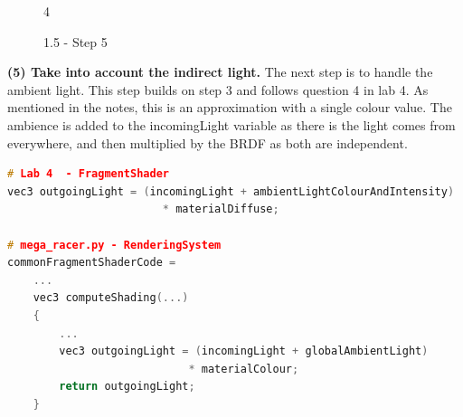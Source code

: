 \documentclass[a4 paper, 12pt]{article}
\begin{document}
    \begin{figure} [H]
        \caption{1.5 - Step 5}   4
    \end{figure}

\textbf{(5) Take into account the indirect light.}
The next step is to handle the ambient light. This step builds on step 3 and follows question 4 in lab 4. As mentioned in the notes, this is an approximation with a single colour value. The ambience is added to the incomingLight variable as there is the light comes from everywhere, and then multiplied by the BRDF as both are independent.
    \begin{lstlisting}[language=c++] 
# Lab 4  - FragmentShader
vec3 outgoingLight = (incomingLight + ambientLightColourAndIntensity) 
                        * materialDiffuse;

# mega_racer.py - RenderingSystem
commonFragmentShaderCode =
    ...
    vec3 computeShading(...)
    {
        ...
        vec3 outgoingLight = (incomingLight + globalAmbientLight) 
                            * materialColour;
        return outgoingLight;
    }       
    \end{lstlisting}
\end{document}
